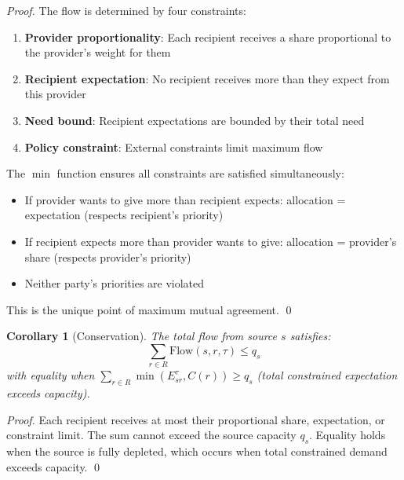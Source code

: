 \documentclass[11pt]{article}
\newtheorem{corollary}{Corollary}
\begin{document}
\begin{proof}
The flow is determined by four constraints:
\begin{enumerate}
\item \textbf{Provider proportionality}: Each recipient receives a share proportional to the provider's weight for them
\item \textbf{Recipient expectation}: No recipient receives more than they expect from this provider
\item \textbf{Need bound}: Recipient expectations are bounded by their total need
\item \textbf{Policy constraint}: External constraints limit maximum flow
\end{enumerate}

The $\min$ function ensures all constraints are satisfied simultaneously:
\begin{itemize}
\item If provider wants to give more than recipient expects: allocation = expectation (respects recipient's priority)
\item If recipient expects more than provider wants to give: allocation = provider's share (respects provider's priority)
\item Neither party's priorities are violated
\end{itemize}

This is the unique point of maximum mutual agreement. \qed
\end{proof}

\begin{corollary}[Conservation]
The total flow from source $s$ satisfies:
\[
\sum_{r \in R} \text{Flow}(s, r, \tau) \leq q_s
\]
with equality when $\sum_{r \in R} \min(E_{sr}^\tau, C(r)) \geq q_s$ (total constrained expectation exceeds capacity).
\end{corollary}

\begin{proof}
Each recipient receives at most their proportional share, expectation, or constraint limit. The sum cannot exceed the source capacity $q_s$. Equality holds when the source is fully depleted, which occurs when total constrained demand exceeds capacity. \qed
\end{proof}
\end{document}
